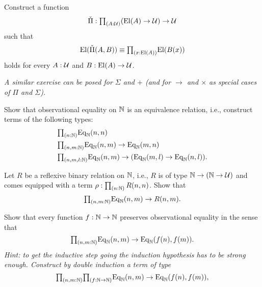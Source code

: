 \begin{exercises}
\item Construct a function
\begin{equation*}
\check{\Pi}:\prd{A:\UU} (\mathrm{El}(A)\to\UU)\to \UU
\end{equation*}
such that
\begin{equation*}
\mathrm{El}(\check{\Pi}(A,B))\jdeq \prd{x:\mathrm{El}(A)}\mathrm{El}(B(x))
\end{equation*}
holds for every $A:\mathcal{U}$ and $B:\mathrm{El}(A)\to\mathcal{U}$. 

\emph{A similar exercise can be posed for $\Sigma$ and $+$ (and for $\to$ and $\times$ as special cases of $\Pi$ and $\Sigma$).}
\item \label{ex:obs_nat_eqrel}Show that observational equality on $\mathbb{N}$ is an equivalence relation, i.e., construct terms of the following types:
\begin{align*}
& \prd{n:\N} \mathrm{Eq}_\N(n,n) \\
& \prd{n,m:\N} \mathrm{Eq}_\N(n,m)\to \mathrm{Eq}_\N(m,n) \\
& \prd{n,m,l:\N} \mathrm{Eq}_\N(n,m)\to (\mathrm{Eq}_\N(m,l)\to \mathrm{Eq}_\N(n,l)).
\end{align*}
\item \label{ex:obs_nat_least}Let $R$ be a reflexive binary relation on $\mathbb{N}$, i.e., $R$ is of type $\mathbb{N}\to (\mathbb{N}\to\mathcal{U})$ and comes equipped with a term $\rho:\prd{n:\N}R(n,n)$. Show that
\begin{equation*}
\prd{n,m:\N} \mathrm{Eq}_\N(n,m)\to R(n,m).
\end{equation*}
\item {}Show that every function $f:\mathbb{N}\to \mathbb{N}$ preserves observational equality in the sense that
\begin{equation*}
\prd{n,m:\N} \mathrm{Eq}_\N(n,m)\to \mathrm{Eq}_\N(f(n),f(m)).
\end{equation*}
\emph{Hint: to get the inductive step going the induction hypothesis has to be strong enough. Construct by double induction a term of type}
\begin{equation*}
\prd{n,m:\N}{f:\N\to\N} \mathrm{Eq}_\N(n,m)\to \mathrm{Eq}_\N(f(n),f(m)),
\end{equation*}

\end{exercises}
